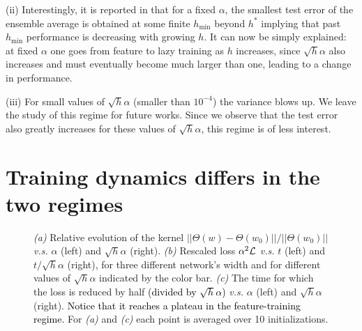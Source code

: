 \documentclass{article}
\newcommand{\mm}[1]{\textcolor{black}{#1}}
\renewcommand{\cite}[1]{\citep{#1}}
\newcommand{\abs}[1]{|\!|#1|\!|}
\begin{document}
(ii) Interestingly, it is reported in \cite{geiger2019scaling} that for a fixed $\alpha$, the smallest test error of the ensemble average is obtained at some finite $h_{\min{}}$ beyond $h^*$ implying that past $h_{\min{}}$ performance is decreasing with growing $h$. It can now be simply explained: at fixed $\alpha$ one goes from feature to lazy training as $h$ increases, since $\sqrt{h}\alpha$ also increases and must eventually become much larger than one, leading to a change in performance.

(iii) For small values of $\sqrt{h} \alpha$ (smaller than $10^{-4}$) the variance blows up. We leave the study of this regime for future works. Since we observe that the test error also greatly increases for these values of $\sqrt{h} \alpha$, this regime is of less interest.

\section{Training dynamics differs in the two regimes}\label{sec:dynamics}

\begin{figure}[th!]
    \centering
    \caption{\emph{(a)} Relative evolution of the kernel $\abs{\Theta(w) - \Theta(w_0)}/\abs{\Theta(w_0)}$ {\it v.s.} $\alpha$ (left) and $\sqrt{h} \alpha$ (right).
    \emph{(b)} Rescaled loss $\alpha^2{\cal L}$ {\it v.s.} $t$ (left) and $t/\sqrt{h}\alpha$ (right), for three different network's width and for different values of $\sqrt{h}\alpha$ indicated by the color bar.
    \emph{(c)} The time for which the loss is reduced by half \mm{(divided by $\sqrt{h}\alpha$)} {\it v.s.} $\alpha$ (left) and $\sqrt{h} \alpha$ (right). \mm{Notice that it reaches a plateau in the feature-training regime.}
    For \emph{(a)} and \emph{(c)} each point is averaged over 10 initializations.
    \label{fig:time_dynamics}}
\end{figure}
\end{document}
